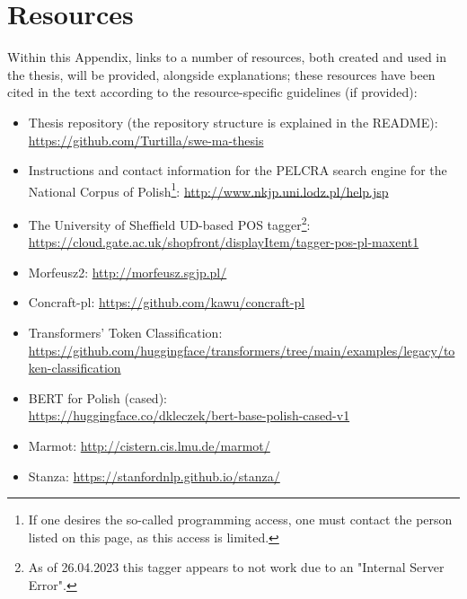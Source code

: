 \section{Resources}
\label{app-resources}

Within this Appendix, links to a number of resources, both created and used in the thesis, will be provided, alongside explanations; these resources have been cited in the text according to the resource-specific guidelines (if provided):
\begin{itemize}
    \item Thesis repository (the repository structure is explained in the README): \url{https://github.com/Turtilla/swe-ma-thesis}
    \item Instructions and contact information for the PELCRA search engine for the National Corpus of Polish\footnote{If one desires the so-called programming access, one must contact the person listed on this page, as this access is limited.}: \url{http://www.nkjp.uni.lodz.pl/help.jsp}
    \item The University of Sheffield UD-based POS tagger\footnote{As of 26.04.2023 this tagger appears to not work due to an "Internal Server Error".}: \url{https://cloud.gate.ac.uk/shopfront/displayItem/tagger-pos-pl-maxent1}
    \item Morfeusz2: \url{http://morfeusz.sgjp.pl/}
    \item Concraft-pl: \url{https://github.com/kawu/concraft-pl}
    \item Transformers' Token Classification: \\ \url{https://github.com/huggingface/transformers/tree/main/examples/legacy/token-classification}
    \item BERT for Polish (cased): \\ \url{https://huggingface.co/dkleczek/bert-base-polish-cased-v1}
    \item Marmot: \url{http://cistern.cis.lmu.de/marmot/}
    \item Stanza: \url{https://stanfordnlp.github.io/stanza/}
\end{itemize}
\newpage

